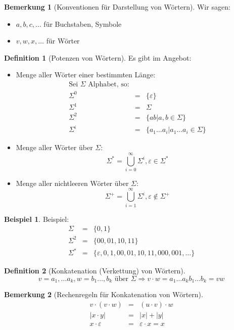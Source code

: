\documentclass[11pt]{article} %
\theoremstyle{definition}
\newtheorem*{beispiel}{Beispiel}
\newtheorem{definition}{Definition}
\newtheorem*{bemerkung}{Bemerkung}
\begin{document}
\begin{bemerkung}[Konventionen für Darstellung von Wörtern]
Wir sagen:
\begin{itemize}
\item $a,b,c,\dots$ für Buchstaben, Symbole
\item $v,w,x,\dots$ für Wörter
\end{itemize}
\end{bemerkung}

\begin{definition}[Potenzen von Wörtern]
Es gibt im Angebot:
\begin{itemize}
\item Menge aller Wörter einer bestimmten Länge:
\begin{eqnarray*}
\textrm{Sei $\Sigma$ Alphabet, so:} && \\
 \Sigma^0 &=& \{\varepsilon\} \\
 \Sigma^1 &=& \Sigma \\
\Sigma^2 &=& \{ ab | a,b \in \Sigma\} \\
\Sigma^i &=& \{ a_1\dots a_i | a_1 \dots a_i \in \Sigma \}
\end{eqnarray*}
\item Menge aller Wörter über $\Sigma$: \[
\Sigma^* = \bigcup\limits_{i = 0}^{\infty} \Sigma^i, \varepsilon \in \Sigma^*
\]
\item Menge aller nichtleeren Wörter über $\Sigma$: \[
\Sigma^+ = \bigcup\limits_{i = 1}^{\infty} \Sigma^i, \varepsilon \notin \Sigma^+
\]
\end{itemize}
\end{definition}
\begin{beispiel}
\item Beispiel: \begin{eqnarray*}
\Sigma &=& \{0,1\} \\
\Sigma^2 &=& \{00, 01, 10, 11\} \\
\Sigma^* &=& \{\varepsilon, 0, 1, 00, 01, 10, 11, 000, 001, \dots \}
\end{eqnarray*}
\end{beispiel}

\begin{definition}[Konkatenation (Verkettung) von Wörtern]
\[
v = a_1,\dots a_k, w = b_1\dots,b_k \textrm{ über } \Sigma \Rightarrow v\cdot w = a_1\dots a_kb_1\dots b_k = vw
\]
\end{definition}

\begin{bemerkung}[Rechenregeln für Konkatenation von Wörtern]
\begin{eqnarray*}
v\cdot(v\cdot w) &=& (u\cdot v)\cdot w \\
|x\cdot y| &=& |x| + |y| \\
x\cdot\varepsilon&=&\varepsilon\cdot x =  x
\end{eqnarray*}
\end{bemerkung}
\end{document}
